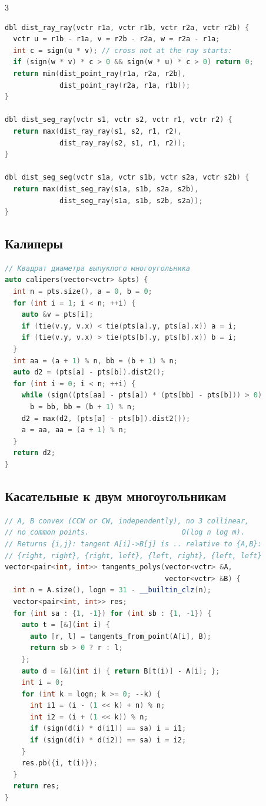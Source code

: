 \documentclass[8pt,a4paper,landscape,twosided]{extarticle}
\begin{document}
\begin{multicols*}{3}
\begin{lstlisting}[language=C++]
dbl dist_ray_ray(vctr r1a, vctr r1b, vctr r2a, vctr r2b) {
  vctr u = r1b - r1a, v = r2b - r2a, w = r2a - r1a;
  int c = sign(u * v); // cross not at the ray starts:
  if (sign(w * v) * c > 0 && sign(w * u) * c > 0) return 0;
  return min(dist_point_ray(r1a, r2a, r2b),
             dist_point_ray(r2a, r1a, r1b));
}

dbl dist_seg_ray(vctr s1, vctr s2, vctr r1, vctr r2) {
  return max(dist_ray_ray(s1, s2, r1, r2),
             dist_ray_ray(s2, s1, r1, r2));
}

dbl dist_seg_seg(vctr s1a, vctr s1b, vctr s2a, vctr s2b) {
  return max(dist_seg_ray(s1a, s1b, s2a, s2b),
             dist_seg_ray(s1a, s1b, s2b, s2a));
}
\end{lstlisting}

\subsection{Калиперы}
\begin{lstlisting}[language=C++]
// Квадрат диаметра выпуклого многоугольника
auto calipers(vector<vctr> &pts) {
  int n = pts.size(), a = 0, b = 0;
  for (int i = 1; i < n; ++i) {
    auto &v = pts[i];
    if (tie(v.y, v.x) < tie(pts[a].y, pts[a].x)) a = i;
    if (tie(v.y, v.x) > tie(pts[b].y, pts[b].x)) b = i;
  }
  int aa = (a + 1) % n, bb = (b + 1) % n;
  auto d2 = (pts[a] - pts[b]).dist2();
  for (int i = 0; i < n; ++i) {
    while (sign((pts[aa] - pts[a]) * (pts[bb] - pts[b])) > 0)
      b = bb, bb = (b + 1) % n;
    d2 = max(d2, (pts[a] - pts[b]).dist2());
    a = aa, aa = (a + 1) % n;
  }
  return d2;
}
\end{lstlisting}

\subsection{Касательные к двум многоугольникам}
\begin{lstlisting}[language=C++]
// A, B convex (CCW or CW, independently), no 3 collinear,
// no common points.                      O(log n log m).
// Returns {i,j}: tangent A[i]->B[j] is .. relative to {A,B}:
// {right, right}, {right, left}, {left, right}, {left, left}
vector<pair<int, int>> tangents_polys(vector<vctr> &A,
                                      vector<vctr> &B) {
  int n = A.size(), logn = 31 - __builtin_clz(n);
  vector<pair<int, int>> res;
  for (int sa : {1, -1}) for (int sb : {1, -1}) {
    auto t = [&](int i) {
      auto [r, l] = tangents_from_point(A[i], B);
      return sb > 0 ? r : l;
    };
    auto d = [&](int i) { return B[t(i)] - A[i]; };
    int i = 0;
    for (int k = logn; k >= 0; --k) {
      int i1 = (i - (1 << k) + n) % n;
      int i2 = (i + (1 << k)) % n;
      if (sign(d(i) * d(i1)) == sa) i = i1;
      if (sign(d(i) * d(i2)) == sa) i = i2;
    }
    res.pb({i, t(i)});
  }
  return res;
}
\end{lstlisting}


\end{multicols*}
\end{document}
